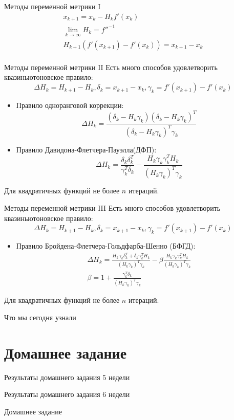 \documentclass[14pt, fleqn, xcolor={dvipsnames, table}]{beamer}
\begin{document}
\begin{frame}{Методы переменной метрики I}
$$\begin{array}{l}
x_{k+1} = x_k - H_kf'(x_k)\\
\lim_{k \to \infty} H_k = f''^{-1}\\
H_{k+1}(f'(x_{k+1}) - f'(x_k)) = x_{k+1} - x_k \\
\end{array}$$
\end{frame}

\begin{frame}{Методы переменной метрики II}
\small
Есть много способов удовлетворить квазиньютоновское правило:
$$
  \Delta H_k = H_{k+1} - H_k, \delta_k = x_{k+1} - x_k, \gamma_k = f'(x_{k+1}) - f'(x_k)
$$
\begin{itemize}
  \item Правило одноранговой коррекции:
  $$
    \Delta H_k = \frac{(\delta_k - H_k\gamma_k)(\delta_k - H_k\gamma_k)^T}{(\delta_k - H_k\gamma_k)^T\gamma_k}
  $$
  \item Правило Давидона-Флетчера-Пауэлла(ДФП):
  $$
    \Delta H_k = \frac{\delta_k\delta_{k}^{T}}{\gamma_{k}^{T}\delta_k} - \frac{H_k\gamma_k\gamma_{k}^{T}H_k}{(H_k\gamma_k)^T\gamma_k}
  $$
\end{itemize}
Для квадратичных функций не более $n$ итераций.
\end{frame}

\begin{frame}{Методы переменной метрики III}
\small
Есть много способов удовлетворить квазиньютоновское правило:
$$
  \Delta H_k = H_{k+1} - H_k, \delta_k = x_{k+1} - x_k, \gamma_k = f'(x_{k+1}) - f'(x_k)
$$
\begin{itemize}
  \item Правило Бройдена-Флетчера-Гольдфарба-Шенно (БФГД):
  $$\begin{array}{l}
    \Delta H_k = \frac{H_k\gamma_k\delta_{k}^{T} + \delta_k\gamma_{k}^{T}H_k}{(H_k\gamma_k)^T\gamma_k} - \beta\frac{H_k\gamma_k\gamma_{k}^{T}H_k}{(H_k\gamma_k)^T\gamma_k} \\
    \beta = 1 + \frac{\gamma_{k}^{T}\delta_k}{(H_k\gamma_k)^T\gamma_k}
  \end{array}$$
\end{itemize}
Для квадратичных функций не более $n$ итераций.
\end{frame}

\begin{frame}{Что мы сегодня узнали}

\section{Домашнее задание}
\end{frame}

\begin{frame}{Результаты домашнего задания 5 недели}

\end{frame}

\begin{frame}{Результаты домашнего задания 6 недели}

\end{frame}

\begin{frame}{Домашнее задание}

\end{frame}
\end{document}

